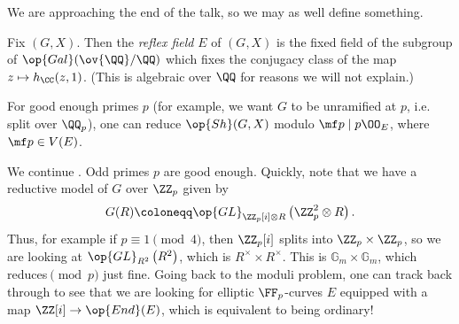 \documentclass{article}
\begin{document}
We are approaching the end of the talk, so we may as well define something.
\begin{definition}
	Fix $(G,X)$. Then the \textit{reflex field} $E$ of $(G,X)$ is the fixed field of the subgroup of $\op{Gal}(\ov{\QQ}/\QQ)$ which fixes the conjugacy class of the map $z\mapsto h_\CC(z,1)$. (This is algebraic over $\QQ$ for reasons we will not explain.)
\end{definition}
For good enough primes $p$ (for example, we want $G$ to be unramified at $p$, i.e. split over $\QQ_p$), one can reduce $\op{Sh}(G,X)$ modulo $\mf p\mid p\OO_E$, where $\mf p\in V(E)$.
\begin{example}
	We continue . Odd primes $p$ are good enough. Quickly, note that we have a reductive model of $G$ over $\ZZ_p$ given by
	\[G(R)\coloneqq\op{GL}_{\ZZ_p[i]\otimes R}\left(\ZZ_p^2\otimes R\right).\]
	Thus, for example if $p\equiv1\pmod4$, then $\ZZ_p[i]$ splits into $\ZZ_p\times\ZZ_p$, so we are looking at $\op{GL}_{R^2}\left(R^2\right)$, which is $R^\times\times R^\times$. This is $\mathbb G_m\times\mathbb G_m$, which reduces$\pmod p$ just fine. Going back to the moduli problem, one can track back through to see that we are looking for elliptic $\FF_p$-curves $E$ equipped with a map $\ZZ[i]\to\op{End}(E)$, which is equivalent to being ordinary!
\end{example}
\end{document}
